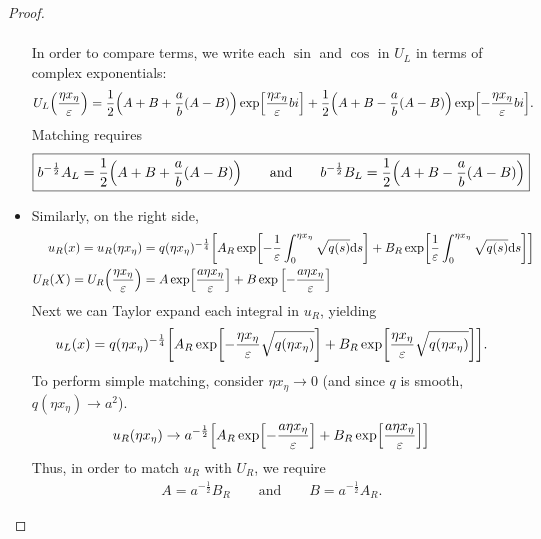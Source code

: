 \documentclass{article} %
\theoremstyle{plain}
\newcommand{\E}{\varepsilon}
\numberwithin{equation}{section} %
\numberwithin{figure}{section} %
\numberwithin{table}{section} %
\begin{document}
\begin{proof}
\begin{itemize}
\begin{align*}
            \end{align*}
            In order to compare terms, we write each $\sin$ and $\cos$ in $U_L$ in terms of complex exponentials:
            \begin{align*}
                U_L\qty(\frac{\eta x_\eta}{\E}) = \frac{1}{2}\qty(A + B + \frac{a}{b}\qty(A - B))\exp[\frac{\eta x_\eta}{\E}bi] + \frac{1}{2}\qty(A + B - \frac{a}{b}\qty(A - B))\exp[-\frac{\eta x_\eta}{\E}bi].
            \end{align*}
            Matching requires
            \begin{align*}
                \boxed{b^{-\frac{1}{2}}A_L = \frac{1}{2}\qty(A + B + \frac{a}{b}(A - B)) \qquad \text{and} \qquad b^{-\frac{1}{2}}B_L = \frac{1}{2}\qty(A + B - \frac{a}{b}\qty(A - B))}
            \end{align*}
        \item
            Similarly, on the right side, 
            \begin{align*}
                u_R(x) = u_R(\eta x_\eta) &= q(\eta x_\eta)^{-\frac{1}{4}}\qty[A_R\exp[-\frac{1}{\E}\int_0^{\eta x_\eta} \sqrt{q(s)} \dd s] + B_R \exp[\frac{1}{\E}\int_0^{\eta x_\eta} \sqrt{q(s)}\dd s]] \\
                U_R(X) = U_R\qty(\frac{\eta x_\eta}{\E}) &= A\exp[\frac{a\eta x_\eta}{\E}] + B\exp\qty[-\frac{a\eta x_\eta}{\E}]
            \end{align*}
            Next we can Taylor expand each integral in $u_R$, yielding
            \begin{align*}
                u_L(x) = q(\eta x_\eta)^{-\frac{1}{4}}\qty[A_R\exp[-\frac{\eta x_\eta}{\E}\sqrt{q(\eta x_\eta)}] + B_R\exp[\frac{\eta x_\eta}{\E}\sqrt{q(\eta x_\eta)}]].
            \end{align*}
            To perform simple matching, consider $\eta x_\eta \rightarrow 0$ (and since $q$ is smooth, $q(\eta x_\eta) \rightarrow a^2$).
            \begin{align*}
                u_R(\eta x_\eta) \rightarrow a^{-\frac{1}{2}}\qty[A_R \exp[-\frac{a\eta x_\eta}{\E}] + B_R\exp[\frac{a\eta x_\eta}{\E}]]
            \end{align*}
            Thus, in order to match $u_R$ with $U_R$, we require
            \begin{align*}
                \boxed{A = a^{-\frac{1}{2}}B_R \qquad \text{and} \qquad B = a^{-\frac{1}{2}}A_R.}
            \end{align*}
    \end{itemize}

\end{proof}
\end{document}
